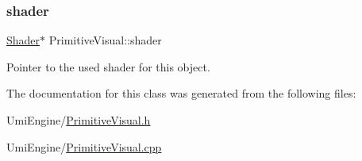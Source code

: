 \mbox{\label{class_primitive_visual_a463e83ee34d0727a19cf417f74ea67e7}} 
\subsubsection{\texorpdfstring{shader}{shader}}
{\footnotesize\ttfamily \mbox{\hyperlink{class_shader}{Shader}}$\ast$ Primitive\+Visual\+::shader}



Pointer to the used shader for this object. 



The documentation for this class was generated from the following files\+:\begin{DoxyCompactItemize}
\item 
Umi\+Engine/\mbox{\hyperlink{_primitive_visual_8h}{Primitive\+Visual.\+h}}\item 
Umi\+Engine/\mbox{\hyperlink{_primitive_visual_8cpp}{Primitive\+Visual.\+cpp}}\end{DoxyCompactItemize}
